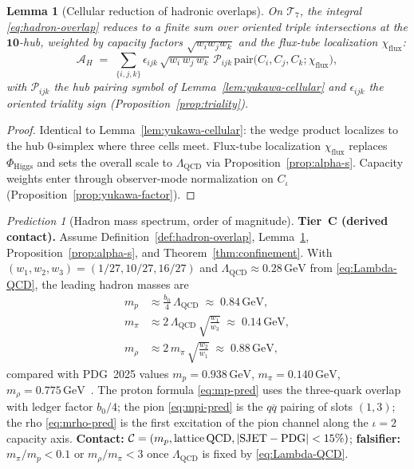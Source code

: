 \documentclass[aps,prd,onecolumn,amsmath,amssymb,nofootinbib,11pt]{revtex4-2}
\numberwithin{equation}{section}
\theoremstyle{plain}
\newtheorem{lemma}[theorem]{Lemma}
\theoremstyle{definition}
\theoremstyle{remark}
\newtheorem{prediction}[theorem]{Prediction}
\begin{document}
\begin{lemma}[Cellular reduction of hadronic overlaps]
\label{lem:hadron-cellular}
On $\mathcal{T}_7$, the integral \eqref{eq:hadron-overlap} reduces to a
finite sum over oriented triple intersections at the $\mathbf{10}$-hub,
weighted by capacity factors $\sqrt{w_i w_j w_k}$ and the flux-tube
localization $\chi_{\mathrm{flux}}$:
\begin{equation}\label{eq:hadron-cellular}
  \mathcal{A}_H
  \;=\;
  \sum_{\{i,j,k\}}
  \epsilon_{ijk}\,
  \sqrt{w_i\,w_j\,w_k}\,
  \mathcal{P}_{ijk}\,
  \mathrm{pair}\!\bigl(C_i,C_j,C_k;\chi_{\mathrm{flux}}\bigr),
\end{equation}
with $\mathcal{P}_{ijk}$ the hub pairing symbol of
Lemma~\ref{lem:yukawa-cellular} and $\epsilon_{ijk}$ the oriented
triality sign (Proposition~\ref{prop:triality}).
\end{lemma}

\begin{proof}
Identical to Lemma~\ref{lem:yukawa-cellular}: the wedge product localizes to
the hub $0$-simplex where three cells meet. Flux-tube localization
$\chi_{\mathrm{flux}}$ replaces $\Phi_{\mathrm{Higgs}}$ and sets the
overall scale to $\Lambda_{\mathrm{QCD}}$ via Proposition~\ref{prop:alpha-s}.
Capacity weights enter through observer-mode normalization on $C_\iota$
(Proposition~\ref{prop:yukawa-factor}).
\end{proof}

\begin{prediction}[Hadron mass spectrum, order of magnitude]
\label{pred:hadron-masses}
\textbf{Tier~C (derived contact).} Assume
Definition~\ref{def:hadron-overlap},
Lemma~\ref{lem:hadron-cellular}, Proposition~\ref{prop:alpha-s}, and
Theorem~\ref{thm:confinement}. With
$(w_1,w_2,w_3)=(1/27,10/27,16/27)$ and
$\Lambda_{\mathrm{QCD}}\approx 0.28\,\mathrm{GeV}$ from \eqref{eq:Lambda-QCD},
the leading hadron masses are
\begin{align}
  m_p
  &\approx
  \frac{b_0}{4}\,\Lambda_{\mathrm{QCD}}
  \;\approx\;
  0.84\,\mathrm{GeV},
  \label{eq:mp-pred}\\[4pt]
  m_\pi
  &\approx
  2\,\Lambda_{\mathrm{QCD}}\,
  \sqrt{\frac{w_1}{w_3}}
  \;\approx\;
  0.14\,\mathrm{GeV},
  \label{eq:mpi-pred}\\[4pt]
  m_\rho
  &\approx
  2\,m_\pi\,
  \sqrt{\frac{w_2}{w_1}}
  \;\approx\;
  0.88\,\mathrm{GeV},
  \label{eq:mrho-pred}
\end{align}
compared with PDG~2025 values $m_p=0.938\,\mathrm{GeV}$,
$m_\pi=0.140\,\mathrm{GeV}$, $m_\rho=0.775\,\mathrm{GeV}$~\cite{PDG2025}.
The proton formula \eqref{eq:mp-pred} uses the three-quark overlap with
ledger factor $b_0/4$; the pion \eqref{eq:mpi-pred} is the $q\overline{q}$
pairing of slots $(1,3)$; the rho \eqref{eq:mrho-pred} is the first
excitation of the pion channel along the $\iota=2$ capacity axis.
\textbf{Contact:}
$\mathcal{C}=(m_p,\mathrm{lattice\,QCD},|{\rm SJET}-{\rm PDG}|<15\%)$;
\textbf{falsifier:} $m_\pi/m_p<0.1$ or $m_\rho/m_\pi<3$ once
$\Lambda_{\mathrm{QCD}}$ is fixed by \eqref{eq:Lambda-QCD}.
\end{prediction}
\end{document}
